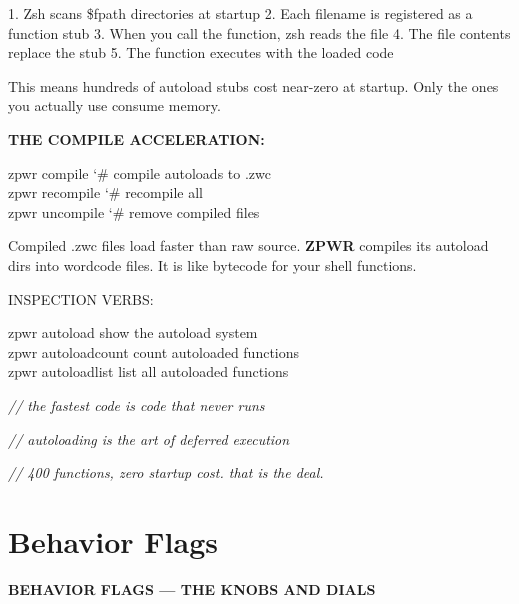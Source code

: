 \documentclass[11pt,a4paper,twoside]{book}
\begin{document}
1. Zsh scans \$fpath directories at startup 2. Each filename is registered as a function stub 3. When you call the function, zsh reads the file 4. The file contents replace the stub 5. The function executes with the loaded code

This means hundreds of autoload stubs cost near-zero at startup. Only the ones you actually use consume memory.


\vspace{12pt}
{\bfseries\color{neonyellow} THE COMPILE ACCELERATION:}\vspace{4pt}

\begin{codebox}
\color{neongreen}zpwr compile       {\char`\#} compile autoloads to .zwc\\
\color{neongreen}zpwr recompile     {\char`\#} recompile all\\
\color{neongreen}zpwr uncompile     {\char`\#} remove compiled files\\
\end{codebox}

Compiled .zwc files load faster than raw source. \textbf{ZPWR} compiles its autoload dirs into wordcode files. It is like bytecode for your shell functions.

INSPECTION VERBS:

\begin{codebox}
\color{neongreen}zpwr autoload          show the autoload system\\
\color{neongreen}zpwr autoloadcount     count autoloaded functions\\
\color{neongreen}zpwr autoloadlist      list all autoloaded functions\\
\end{codebox}

{\small\itshape\color{dimtext} // the fastest code is code that never runs}

{\small\itshape\color{dimtext} // autoloading is the art of deferred execution}

{\small\itshape\color{dimtext} // 400 functions, zero startup cost. that is the deal.}


\vspace{16pt}

\section{Behavior Flags}


\vspace{10pt}
{\large\bfseries\color{neoncyan} BEHAVIOR FLAGS — THE KNOBS AND DIALS}\vspace{6pt}
\end{document}
